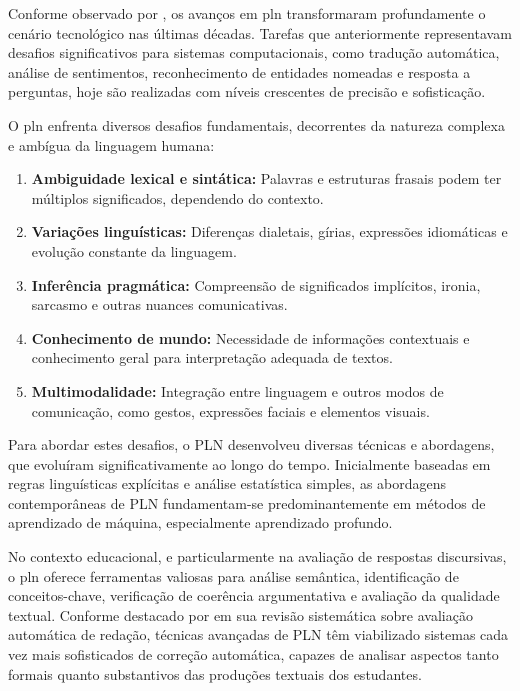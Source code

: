Conforme observado por , os avanços em \gls{pln} transformaram profundamente o cenário tecnológico nas últimas décadas. Tarefas que anteriormente representavam desafios significativos para sistemas computacionais, como tradução automática, análise de sentimentos, reconhecimento de entidades nomeadas e resposta a perguntas, hoje são realizadas com níveis crescentes de precisão e sofisticação.

O \gls{pln} enfrenta diversos desafios fundamentais, decorrentes da natureza complexa e ambígua da linguagem humana:

\begin{enumerate}
  \item \textbf{Ambiguidade lexical e sintática:} Palavras e estruturas frasais podem ter múltiplos significados, dependendo do contexto.
  \item \textbf{Variações linguísticas:} Diferenças dialetais, gírias, expressões idiomáticas e evolução constante da linguagem.
  \item \textbf{Inferência pragmática:} Compreensão de significados implícitos, ironia, sarcasmo e outras nuances comunicativas.
  \item \textbf{Conhecimento de mundo:} Necessidade de informações contextuais e conhecimento geral para interpretação adequada de textos.
  \item \textbf{Multimodalidade:} Integração entre linguagem e outros modos de comunicação, como gestos, expressões faciais e elementos visuais.
\end{enumerate}

Para abordar estes desafios, o PLN desenvolveu diversas técnicas e abordagens, que evoluíram significativamente ao longo do tempo. Inicialmente baseadas em regras linguísticas explícitas e análise estatística simples, as abordagens contemporâneas de PLN fundamentam-se predominantemente em métodos de aprendizado de máquina, especialmente aprendizado profundo.

No contexto educacional, e particularmente na avaliação de respostas discursivas, o \gls{pln} oferece ferramentas valiosas para análise semântica, identificação de conceitos-chave, verificação de coerência argumentativa e avaliação da qualidade textual. Conforme destacado por  em sua revisão sistemática sobre avaliação automática de redação, técnicas avançadas de PLN têm viabilizado sistemas cada vez mais sofisticados de correção automática, capazes de analisar aspectos tanto formais quanto substantivos das produções textuais dos estudantes.

